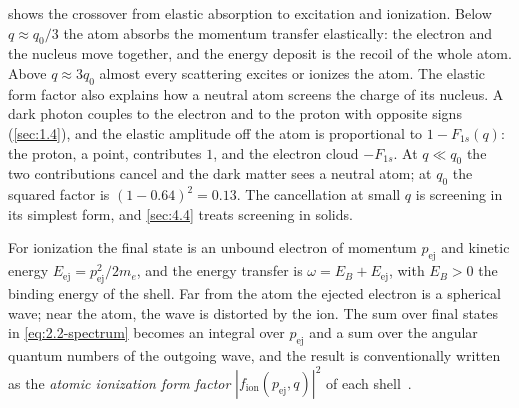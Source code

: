  shows the crossover from elastic absorption to excitation and ionization. Below $q \approx q_0/3$ the atom absorbs the momentum transfer elastically: the electron and the nucleus move together, and the energy deposit is the recoil of the whole atom. Above $q \approx 3q_0$ almost every scattering excites or ionizes the atom. The elastic form factor also explains how a neutral atom screens the charge of its nucleus. A dark photon couples to the electron and to the proton with opposite signs (\cref{sec:1.4}), and the elastic amplitude off the atom is proportional to $1 - F_{1s}(q)$: the proton, a point, contributes $1$, and the electron cloud $-F_{1s}$. At $q \ll q_0$ the two contributions cancel and the dark matter sees a neutral atom; at $q_0$ the squared factor is $(1 - 0.64)^2 = 0.13$. The cancellation at small $q$ is screening in its simplest form, and \cref{sec:4.4} treats screening in solids.

For ionization the final state is an unbound electron of momentum $p_{\mathrm{ej}}$ and kinetic energy $E_{\mathrm{ej}} = p_{\mathrm{ej}}^2/2m_e$, and the energy transfer is $\omega = E_B + E_{\mathrm{ej}}$, with $E_B > 0$ the binding energy of the shell. Far from the atom the ejected electron is a spherical wave; near the atom, the wave is distorted by the ion. The sum over final states in \cref{eq:2.2-spectrum} becomes an integral over $p_{\mathrm{ej}}$ and a sum over the angular quantum numbers of the outgoing wave, and the result is conventionally written as the \emph{atomic ionization form factor} $|f_{\mathrm{ion}}(p_{\mathrm{ej}}, q)|^2$ of each shell~\cite[Eq.~(6)]{essig2012direct}.

